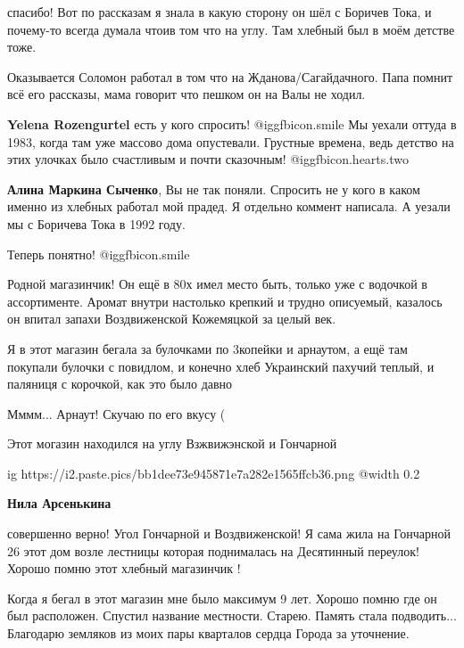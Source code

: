 спасибо! Вот по рассказам я знала в какую сторону он шёл с Боричев Тока, и
почему-то всегда думала чтоив том что на углу. Там хлебный был в моём детстве
тоже.


Оказывается Соломон работал в том что на Жданова/Сагайдачного. Папа помнит всё
его рассказы, мама говорит что пешком он на Валы не ходил.

\textbf{Yelena Rozengurtel} есть у кого спросить! @igg{fbicon.smile} 
Мы уехали оттуда в 1983, когда там уже массово дома опустевали.
Грустные времена, ведь детство на этих улочках было счастливым и почти сказочным! @igg{fbicon.hearts.two} 

\textbf{Алина Маркина Сыченко}, Вы не так поняли. Спросить не у кого в каком именно из хлебных работал мой прадед. Я отдельно коммент написала. А уезали мы с Боричева Тока в 1992 году.

Теперь понятно! @igg{fbicon.smile} 

Родной магазинчик!
Он ещё в 80х имел место быть, только уже с водочкой в ассортименте.
Аромат внутри настолько крепкий и трудно описуемый, казалось он впитал запахи Воздвиженской Кожемяцкой за целый век.


Я в этот магазин бегала за булочками по 3копейки и арнаутом, а ещё там покупали
булочки с повидлом, и конечно хлеб Украинский пахучий теплый, и паляниця с
корочкой, как это было давно


Мммм... Арнаут! Скучаю по его вкусу (

Этот могазин находился на углу Взжвижэнской и Гончарной

\ifcmt
  ig https://i2.paste.pics/bb1dee73e945871e7a282e1565ffcb36.png
  @width 0.2
\fi

\textbf{Нила Арсенькина} 

совершенно верно! Угол Гончарной и Воздвиженской! Я сама жила на Гончарной 26
этот дом возле лестницы которая поднималась на Десятинный переулок! Хорошо
помню этот хлебный магазинчик !


Когда я бегал в этот магазин мне было максимум 9 лет. Хорошо помню где он был
расположен. Спустил название местности. Старею. Память стала подводить...
Благодарю земляков из моих пары кварталов сердца Города за уточнение.
